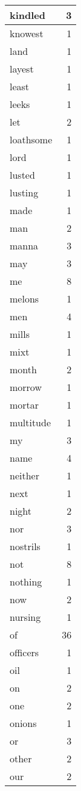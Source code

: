 \begin{center}
\begin{longtable}{l|r}
kindled & 3 \\ \hline
knowest & 1 \\ \hline
land & 1 \\ \hline
layest & 1 \\ \hline
least & 1 \\ \hline
leeks & 1 \\ \hline
let & 2 \\ \hline
loathsome & 1 \\ \hline
lord & 1 \\ \hline
lusted & 1 \\ \hline
lusting & 1 \\ \hline
made & 1 \\ \hline
man & 2 \\ \hline
manna & 3 \\ \hline
may & 3 \\ \hline
me & 8 \\ \hline
melons & 1 \\ \hline
men & 4 \\ \hline
mills & 1 \\ \hline
mixt & 1 \\ \hline
month & 2 \\ \hline
morrow & 1 \\ \hline
mortar & 1 \\ \hline
multitude & 1 \\ \hline
my & 3 \\ \hline
name & 4 \\ \hline
neither & 1 \\ \hline
next & 1 \\ \hline
night & 2 \\ \hline
nor & 3 \\ \hline
nostrils & 1 \\ \hline
not & 8 \\ \hline
nothing & 1 \\ \hline
now & 2 \\ \hline
nursing & 1 \\ \hline
of & 36 \\ \hline
officers & 1 \\ \hline
oil & 1 \\ \hline
on & 2 \\ \hline
one & 2 \\ \hline
onions & 1 \\ \hline
or & 3 \\ \hline
other & 2 \\ \hline
our & 2 \\ \hline

\end{longtable}
\end{center}
